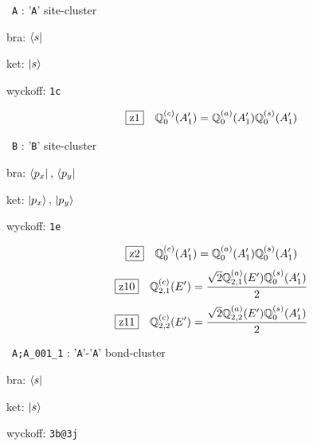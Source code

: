 \documentclass[fleqn,10pt,landscape]{jsarticle}
\begin{document}
\vspace{5mm}

\noindent\textbullet\, \texttt{A} : '\texttt{A}' site-cluster

\noindent\quad * bra: $\bra{s}$

\noindent\quad * ket: $\ket{s}$

\noindent\quad * wyckoff: \texttt{1c}

\begin{dmath*}
\hspace*{3mm}\fbox{z1}\quad \mathbb{Q}_{0}^{(c)}(A_{1}^{\prime})=\mathbb{Q}_{0}^{(a)}(A_{1}^{\prime}) \mathbb{Q}_{0}^{(s)}(A_{1}^{\prime})
\end{dmath*}
\vspace{5mm}

\noindent\textbullet\, \texttt{B} : '\texttt{B}' site-cluster

\noindent\quad * bra: $\bra{p_{x}},\, \bra{p_{y}}$

\noindent\quad * ket: $\ket{p_{x}},\, \ket{p_{y}}$

\noindent\quad * wyckoff: \texttt{1e}

\begin{dmath*}
\hspace*{3mm}\fbox{z2}\quad \mathbb{Q}_{0}^{(c)}(A_{1}^{\prime})=\mathbb{Q}_{0}^{(a)}(A_{1}^{\prime}) \mathbb{Q}_{0}^{(s)}(A_{1}^{\prime})
\end{dmath*}
\begin{dmath*}
\hspace*{3mm}\fbox{z10}\quad \mathbb{Q}_{2,1}^{(c)}(E^{\prime})=\frac{\sqrt{2} \mathbb{Q}_{2,1}^{(a)}(E^{\prime}) \mathbb{Q}_{0}^{(s)}(A_{1}^{\prime})}{2}
\end{dmath*}
\begin{dmath*}
\hspace*{3mm}\fbox{z11}\quad \mathbb{Q}_{2,2}^{(c)}(E^{\prime})=\frac{\sqrt{2} \mathbb{Q}_{2,2}^{(a)}(E^{\prime}) \mathbb{Q}_{0}^{(s)}(A_{1}^{\prime})}{2}
\end{dmath*}
\vspace{5mm}

\noindent\textbullet\, \texttt{A;A_001_1} : '\texttt{A}'-'\texttt{A}' bond-cluster

\noindent\quad * bra: $\bra{s}$

\noindent\quad * ket: $\ket{s}$

\noindent\quad * wyckoff: \texttt{3b@3j}
\end{document}
